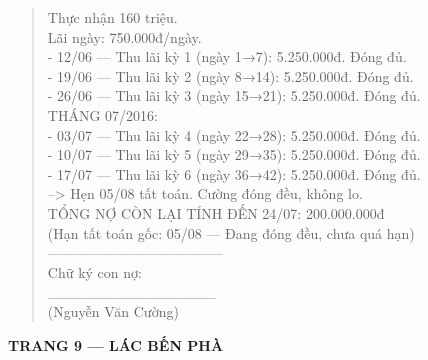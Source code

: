 \documentclass[12pt,a4paper]{article}
\begin{document}
\begin{quote}
          Thực nhận 160 triệu.\\
          Lãi ngày: 750.000đ/ngày.\\
\vspace{0.2cm}
- 12/06 --- Thu lãi kỳ 1 (ngày 1→7): 5.250.000đ. Đóng đủ.\\
- 19/06 --- Thu lãi kỳ 2 (ngày 8→14): 5.250.000đ. Đóng đủ.\\
- 26/06 --- Thu lãi kỳ 3 (ngày 15→21): 5.250.000đ. Đóng đủ.\\
\vspace{0.2cm}
THÁNG 07/2016:\\
- 03/07 --- Thu lãi kỳ 4 (ngày 22→28): 5.250.000đ. Đóng đủ.\\
- 10/07 --- Thu lãi kỳ 5 (ngày 29→35): 5.250.000đ. Đóng đủ.\\
- 17/07 --- Thu lãi kỳ 6 (ngày 36→42): 5.250.000đ. Đóng đủ.\\
          --> Hẹn 05/08 tất toán. Cường đóng đều, không lo.\\
\vspace{0.2cm}
TỔNG NỢ CÒN LẠI TÍNH ĐẾN 24/07: 200.000.000đ\\
(Hạn tất toán gốc: 05/08 --- Đang đóng đều, chưa quá hạn)\\
--------------------------------------\\
Chữ ký con nợ:\\
\vspace{0.2cm}
\_\_\_\_\_\_\_\_\_\_\_\_\_\_\_\_\\
(Nguyễn Văn Cường)\\
\end{quote}




\vspace{0.35cm}\noindent\textbf{\large TRANG 9 — LÁC BẾN PHÀ}\\[0.15cm]
\end{document}
